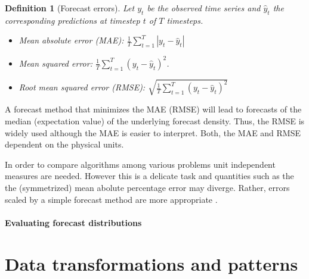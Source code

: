 \documentclass[12pt,a4paper]{article}
\newtheorem{definition}{Definition}
\begin{document}
\begin{definition}[Forecast errors]
Let $y_t$ be the observed time series and  $\hat y_t$ the corresponding predictions at timestep $t$  of $T$ timesteps.
	\begin{itemize}
		\item Mean absolute error (MAE):  $\frac{1}{T}\sum_{t=1}^T \left | y_t - \hat y_t\right |$
		  \item Mean squared error: $\frac{1}{T}\sum_{t=1}^T \left ( y_t - \hat y_t\right ) ^2$. 
		  \item Root mean squared error (RMSE):  $\sqrt{\frac{1}{T}\sum_{t=1}^T \left ( y_t - \hat y_t\right ) ^2}$
	\end{itemize}
\end{definition}
A forecast method that minimizes the MAE (RMSE) will lead to forecasts of the median (expectation value) of the underlying forecast density. Thus, the RMSE is widely used although the MAE is easier to interpret. Both, the MAE and RMSE dependent on the physical units. 

In order to compare algorithms among various problems unit independent measures are needed. However this is a delicate task and quantities such as the the  (symmetrized) mean abolute percentage error may diverge. Rather, errors scaled by a simple forecast method are more appropriate \cite{hyndman_forecasting_principles_2018, Hyndman06anotherlook}. 

\paragraph{Evaluating forecast distributions}


\section{Data transformations and patterns}
\end{document}
